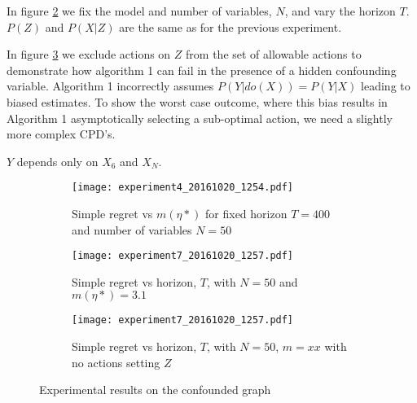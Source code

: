 In figure \ref{fig:simple_vs_T_general} we fix the model and number of variables, $N$, and vary the horizon $T$. $P(Z)$ and $P(X|Z)$ are the same as for the previous experiment.  

In figure \ref{fig:simple_vs_T_misspecified} we exclude actions on $Z$ from the set of allowable actions to demonstrate how algorithm 1 can fail in the presence of a hidden confounding variable. Algorithm 1 incorrectly assumes $P(Y|do(X)) = P(Y|X)$ leading to biased estimates. To show the worst case outcome, where this bias results in Algorithm 1 asymptotically selecting a sub-optimal action, we need a slightly more complex CPD's. 


$Y$ depends only on $X_6$ and $X_N$. 


\begin{figure}[H]
    \begin{subfigure}[t]{0.3\textwidth}
		\centering    
    		\texttt{[image: experiment4\_20161020\_1254.pdf]}
    		\caption{Simple regret vs $m(\eta*)$ for fixed horizon $T=400$ and number of variables $N = 50$}
        \label{fig:simple_vs_m_general}
    \end{subfigure}\hfill
    \begin{subfigure}[t]{0.3\textwidth}
    		\centering
        \texttt{[image: experiment7\_20161020\_1257.pdf]}
    		\caption{Simple regret vs horizon, $T$, with $N = 50$ and $m(\eta*)=3.1$ }
        \label{fig:simple_vs_T_general}
    \end{subfigure}\hfill
    \begin{subfigure}[t]{0.3\textwidth}
    		\centering
    		\texttt{[image: experiment7\_20161020\_1257.pdf]}
    		\caption{Simple regret vs horizon, $T$, with $N = 50$, $m=xx$ with no actions setting $Z$}
    		\label{fig:simple_vs_T_misspecified}
    \end{subfigure}
    \caption{Experimental results on the confounded graph}
    \label{fig:experiments}
\end{figure}


